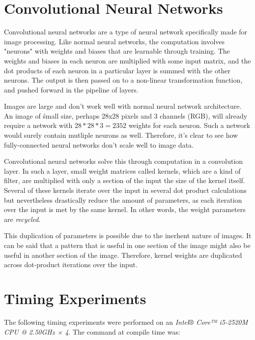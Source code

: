 \documentclass[12pt]{article}
\begin{document}
\section{Convolutional Neural Networks}
Convolutional neural networks are a type of neural network specifically made for image processing. Like normal neural networks, the computation involves "neurons" with weights and biases that are learnable through training. The weights and biases in each neuron are multiplied with some input matrix, and the dot products of each neuron in a particular layer is summed with the other neurons. The output is then passed on to a non-linear transformation function, and pushed forward in the pipeline of layers.

Images are large and don't work well with normal neural network architecture. An image of śmall size, perhaps 28x28 pixels and 3 channels (RGB), will already require a network with \begin{math}28*28*3 = 2352\end{math} weights for each neuron. Such a network would surely contain mutliple neurons as well. Therefore, it's clear to see how fully-connected neural networks don't scale well to image data.

Convolutional neural networks solve this through computation in a convolution layer. In such a layer, small weight matrices called kernels, which are a kind of filter, are multiplied with only a section of the input the size of the kernel itself. Several of these kernels iterate over the input in several dot product calculations but nevertheless drastically reduce the amount of parameters, as each iteration over the input is met by the same kernel. In other words, the weight parameters are \textit{recycled}.

This duplication of parameters is possible due to the inerhent nature of images. It can be said that a pattern that is useful in one section of the image might also be useful in another section of the image. Therefore, kernel weights are duplicated across dot-product iterations over the input.










\section{Timing Experiments}
The following timing experiments were performed on an \textit{Intel® Core™ i5-2520M CPU @ 2.50GHz × 4}. The command at compile time was: 
\end{document}
